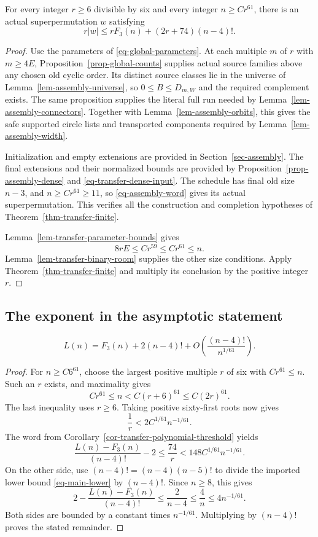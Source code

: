 \begin{corollary}\label{cor-transfer-polynomial-threshold}
For every integer $r\ge6$ divisible by six and every integer
$n\ge Cr^{61}$, there is an actual superpermutation $w$ satisfying
\[
 r|w|\le rF_3(n)+(2r+74)(n-4)!.
\]
\end{corollary}

\begin{proof}
Use the parameters of \eqref{eq-global-parameters}. At each multiple
$m$ of $r$ with $m\ge4E$, Proposition~\ref{prop-global-counts}
supplies actual source families above any chosen old cyclic order. Its
distinct source classes lie in the universe of
Lemma~\ref{lem-assembly-universe}, so $0\le B\le D_{m,W}$ and the
required complement exists. The same proposition supplies the literal
full run needed by Lemma~\ref{lem-assembly-connectors}. Together with
Lemma~\ref{lem-assembly-orbits}, this gives the safe supported circle
lists and transported components required by
Lemma~\ref{lem-assembly-width}.

Initialization and empty extensions are provided in
Section~\ref{sec-assembly}. The final extensions and their normalized
bounds are provided by Proposition~\ref{prop-assembly-dense} and
\eqref{eq-transfer-dense-input}. The schedule has final old size $n-3$,
and $n\ge Cr^{61}\ge11$, so \eqref{eq-assembly-word} gives its actual
superpermutation. This verifies all the construction and completion
hypotheses of Theorem~\ref{thm-transfer-finite}.

Lemma~\ref{lem-transfer-parameter-bounds} gives
\[
 8rE\le Cr^{59}\le Cr^{61}\le n.
\]
Lemma~\ref{lem-transfer-binary-room} supplies the other size conditions.
Apply Theorem~\ref{thm-transfer-finite} and multiply its conclusion by
the positive integer $r$.
\end{proof}

\subsection{The exponent in the asymptotic statement}

\begin{corollary}\label{cor-transfer-asymptotic}
\[
 L(n)=F_3(n)+2(n-4)!+
 O\!\left(\frac{(n-4)!}{n^{1/61}}\right).
\]
\end{corollary}

\begin{proof}
For $n\ge C6^{61}$, choose the largest positive multiple $r$ of six
with $Cr^{61}\le n$. Such an $r$ exists, and maximality gives
\[
 Cr^{61}\le n<C(r+6)^{61}\le C(2r)^{61}.
\]
The last inequality uses $r\ge6$. Taking positive sixty-first roots
now gives
\[
 \frac1r<2C^{1/61}n^{-1/61}.
\]
The word from Corollary~\ref{cor-transfer-polynomial-threshold} yields
\[
 \frac{L(n)-F_3(n)}{(n-4)!}-2
 \le\frac{74}{r}
 <148C^{1/61}n^{-1/61}.
\]
On the other side, use $(n-4)!=(n-4)(n-5)!$ to divide the imported lower bound
\eqref{eq-main-lower} by $(n-4)!$. Since $n\ge8$, this gives
\[
 2-\frac{L(n)-F_3(n)}{(n-4)!}
 \le\frac2{n-4}\le\frac4n\le4n^{-1/61}.
\]
Both sides are bounded by a constant times $n^{-1/61}$. Multiplying
by $(n-4)!$ proves the stated remainder.
\end{proof}
